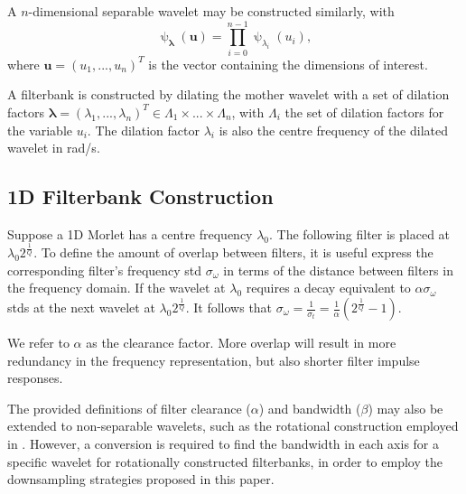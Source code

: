 \documentclass[journal]{IEEEtran}
\newcommand{\vect}[1]{\boldsymbol{\mathbf{#1}}}
\begin{document}
A $n$-dimensional separable wavelet may be constructed similarly, with
\begin{equation}
    \uppsi_{\vect{\lambda} }(\mathbf{u}) = \prod_{i=0}^{n-1} \uppsi_{\lambda_i}(u_i),
\end{equation}
where $\mathbf{u} = \left(u_1, ..., u_n\right)^T$ is the vector containing the dimensions of interest.

A filterbank is constructed by dilating the mother wavelet with a set of dilation factors $\vect{\lambda} =(\lambda_1, ..., \lambda_n )^T \in \Lambda_1 \times ... \times \Lambda_n$, with $\Lambda_i$ the set of dilation factors for the variable $u_i$. The dilation factor $\lambda_i$ is also the centre frequency of the dilated wavelet in rad/s. 



\subsection{1D Filterbank Construction}
\label{sec:filterbank}
 Suppose a 1D Morlet has a centre frequency $\lambda_0$. The following filter is placed at $\lambda_0 2^{\frac{1}{Q}}$. To define the amount of overlap between filters, it is useful express the corresponding filter's frequency \ac{std} $\sigma_\omega$ in terms of the distance between filters in the frequency domain. If the wavelet at $\lambda_0$ requires a decay equivalent to $\alpha \sigma_\omega$ \ac{std}s at the next wavelet at $\lambda_0 2^{\frac{1}{Q}}$. It follows that $\sigma_\omega = \frac{1}{\sigma_t} = \frac{1}{\alpha}\left( 2^\frac{1}{Q} - 1 \right)$.

We refer to $\alpha$ as the clearance factor. More overlap will result in more redundancy in the frequency representation, but also shorter filter impulse responses. 


The provided definitions of filter clearance ($\alpha$) and bandwidth ($\beta$) may also be extended to non-separable wavelets, such as the rotational construction employed in \cite{2dscattering}. However, a conversion is required to find the bandwidth in each axis for a specific wavelet for rotationally constructed filterbanks, in order to employ the downsampling strategies proposed in this paper.
\end{document}
